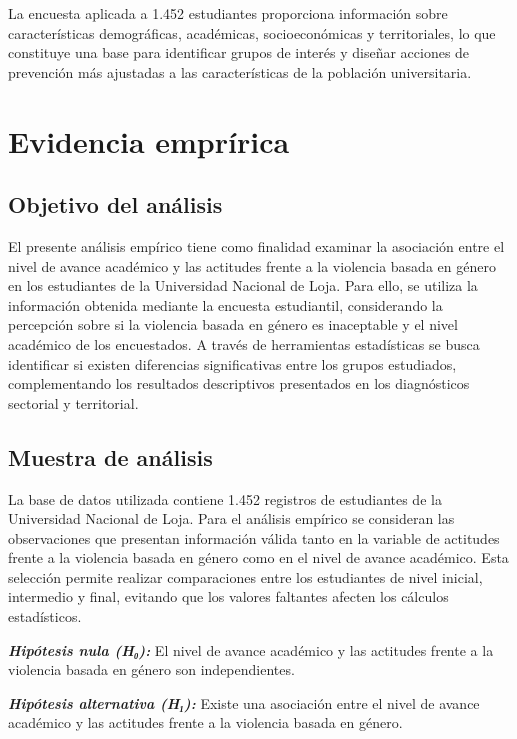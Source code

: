 \documentclass[
  spanish,
  11pt,
  letterpaper,
  DIV=11,
  numbers=noendperiod]{scrreprt}
\begin{document}
La encuesta aplicada a 1.452 estudiantes proporciona información sobre
características demográficas, académicas, socioeconómicas y
territoriales, lo que constituye una base para identificar grupos de
interés y diseñar acciones de prevención más ajustadas a las
características de la población universitaria.


\chapter{Evidencia emprírica}\label{evidencia-empruxedrica}

\section{Objetivo del análisis}\label{objetivo-del-anuxe1lisis}

El presente análisis empírico tiene como finalidad examinar la
asociación entre el nivel de avance académico y las actitudes frente a
la violencia basada en género en los estudiantes de la Universidad
Nacional de Loja. Para ello, se utiliza la información obtenida mediante
la encuesta estudiantil, considerando la percepción sobre si la
violencia basada en género es inaceptable y el nivel académico de los
encuestados. A través de herramientas estadísticas se busca identificar
si existen diferencias significativas entre los grupos estudiados,
complementando los resultados descriptivos presentados en los
diagnósticos sectorial y territorial.

\section{Muestra de análisis}\label{muestra-de-anuxe1lisis}

La base de datos utilizada contiene 1.452 registros de estudiantes de la
Universidad Nacional de Loja. Para el análisis empírico se consideran
las observaciones que presentan información válida tanto en la variable
de actitudes frente a la violencia basada en género como en el nivel de
avance académico. Esta selección permite realizar comparaciones entre
los estudiantes de nivel inicial, intermedio y final, evitando que los
valores faltantes afecten los cálculos estadísticos.

\textbf{\emph{Hipótesis nula (H₀):}} El nivel de avance académico y las
actitudes frente a la violencia basada en género son independientes.

\textbf{\emph{Hipótesis alternativa (H₁):}} Existe una asociación entre
el nivel de avance académico y las actitudes frente a la violencia
basada en género.
\end{document}

